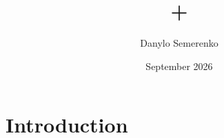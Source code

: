 \documentclass{article}
\title{+}
\author{Danylo Semerenko}
\date{September 2026}
\begin{document}
\maketitle

\section{Introduction}
\end{document}
